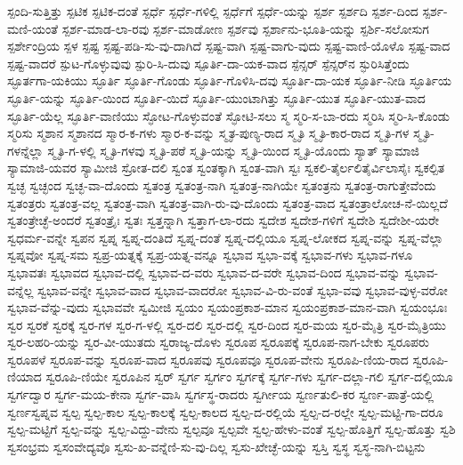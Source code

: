 ಸ್ಪಂದಿ-ಸುತ್ತಿತ್ತು
ಸ್ಪಟಿಕ
ಸ್ಪಟಿಕ-ದಂತೆ
ಸ್ಪರ್ಧೆ
ಸ್ಪರ್ಧೆ-ಗಳಿಲ್ಲಿ
ಸ್ಪರ್ಧೆಗೆ
ಸ್ಪರ್ಧೆ-ಯನ್ನು
ಸ್ಪರ್ಶ
ಸ್ಪರ್ಶದಿ
ಸ್ಪರ್ಶ-ದಿಂದ
ಸ್ಪರ್ಶ-ಮಣಿ-ಯಂತೆ
ಸ್ಪರ್ಶ-ಮಾಡ-ಲಾ-ರವು
ಸ್ಪರ್ಶ-ಮಾಡೋಣ
ಸ್ಪರ್ಶವು
ಸ್ಪರ್ಶಾನು-ಭೂತಿ-ಯನ್ನು
ಸ್ಪರ್ಶಿ-ಸಲೋಸುಗ
ಸ್ಪರ್ಶೇಂದ್ರಿಯ
ಸ್ಪಳ
ಸ್ಪಷ್ಟ
ಸ್ಪಷ್ಟ-ಪಡಿ-ಸು-ವು-ದಾಗಿದೆ
ಸ್ಪಷ್ಟ-ವಾಗಿ
ಸ್ಪಷ್ಟ-ವಾಗು-ವುದು
ಸ್ಪಷ್ಟ-ವಾಣಿ-ಯೊಳೊ
ಸ್ಪಷ್ಟ-ವಾದ
ಸ್ಪಷ್ಟ-ವಾದರೆ
ಸ್ಪುಟ-ಗೊಳ್ಳುವುವು
ಸ್ಪುರಿ-ಸಿ-ದುವು
ಸ್ಪೂರ್ತಿ-ದಾ-ಯಕ-ವಾದ
ಸ್ಪೆನ್ಸರ್
ಸ್ಪೆನ್ಸರ್‌ನ
ಸ್ಫುರಿಸಿತ್ತೆಂದು
ಸ್ಫೂರ್ತಗಾ-ಯಕಿಯು
ಸ್ಫೂರ್ತಿ
ಸ್ಫೂರ್ತಿ-ಗೊಂಡು
ಸ್ಫೂರ್ತಿ-ಗೊಳಿಸಿ-ದವು
ಸ್ಫೂರ್ತಿ-ದಾ-ಯಕ
ಸ್ಫೂರ್ತಿ-ನೀಡಿ
ಸ್ಫೂರ್ತಿಯ
ಸ್ಫೂರ್ತಿ-ಯನ್ನು
ಸ್ಫೂರ್ತಿ-ಯಿಂದ
ಸ್ಫೂರ್ತಿ-ಯಿದೆ
ಸ್ಫೂರ್ತಿ-ಯುಂಟಾಗಿತ್ತು
ಸ್ಫೂರ್ತಿ-ಯುತ
ಸ್ಫೂರ್ತಿ-ಯುತ-ವಾದ
ಸ್ಫೂರ್ತಿ-ಯೆಲ್ಲ
ಸ್ಫೂರ್ತಿ-ವಾಣಿಯು
ಸ್ಫೋಟ-ಗೊಳ್ಳುವಂತೆ
ಸ್ಫೋಟಿ-ಸಲು
ಸ್ಮ
ಸ್ಮರಿ-ಸ-ಬಾ-ರದು
ಸ್ಮರಿಸಿ
ಸ್ಮರಿ-ಸಿ-ಕೊಂಡು
ಸ್ಮರಿಸು
ಸ್ಮಶಾನ
ಸ್ಮಶಾನದ
ಸ್ಮಾರ-ಕ-ಗಳು
ಸ್ಮಾರ-ಕ-ವನ್ನು
ಸ್ಮೃತ-ಪುಣ್ಯ-ರಾದ
ಸ್ಮೃತಿ
ಸ್ಮೃತಿ-ಕಾರ-ರಾದ
ಸ್ಮೃತಿ-ಗಳ
ಸ್ಮೃತಿ-ಗಳನ್ನೆಲ್ಲಾ
ಸ್ಮೃತಿ-ಗ-ಳಲ್ಲಿ
ಸ್ಮೃತಿ-ಗಳವು
ಸ್ಮೃತಿ-ಪಠೆ
ಸ್ಮೃತಿ-ಯನ್ನು
ಸ್ಮೃತಿ-ಯಿಂದ
ಸ್ಮೃತಿ-ಯೊಂದು
ಸ್ಯಾತ್
ಸ್ಯಾಮಾಜಿ
ಸ್ಯಾಮಾಜಿ-ಯವರ
ಸ್ಯಾಮೀಜಿ
ಸ್ರೋತ-ದಲಿ
ಸ್ವಂತ
ಸ್ವಂತಕ್ಕಾಗಿ
ಸ್ವಂತ-ವಾಗಿ
ಸ್ವಃ
ಸ್ವಕಲಿ-ತೈರ್ಲಲಿತೈರ್ವಿಲಾಸೈಃ
ಸ್ವಕಲ್ಪಿತ
ಸ್ವಚ್ಛ
ಸ್ವಚ್ಛಂದ
ಸ್ವಚ್ಛ-ವಾ-ದೊಂದು
ಸ್ವತಂತ್ರ
ಸ್ವತಂತ್ರ-ನಾಗಿ
ಸ್ವತಂತ್ರ-ನಾಗಿಯೇ
ಸ್ವತಂತ್ರನು
ಸ್ವತಂತ್ರ-ರಾಗುತ್ತೇವೆಂದು
ಸ್ವತಂತ್ರರು
ಸ್ವತಂತ್ರ-ವಲ್ಲ
ಸ್ವತಂತ್ರ-ವಾಗಿ
ಸ್ವತಂತ್ರ-ವಾಗಿ-ರು-ವು-ದೊಂದು
ಸ್ವತಂತ್ರ-ವಾದ
ಸ್ವತಂತ್ರಾಲೋಚ-ನೆ-ಯಿಲ್ಲದೆ
ಸ್ವತಂತ್ರೇಚ್ಛೆ-ಅಂದರೆ
ಸ್ವತಂತ್ರೈಃ
ಸ್ವತಃ
ಸ್ವತ್ತನ್ನಾಗಿ
ಸ್ವತ್ತಾಗ-ಲಾ-ರದು
ಸ್ವದೇಶ
ಸ್ವದೇಶ-ಗಳಿಗೆ
ಸ್ವದೇಶಿ
ಸ್ವದೇಶೀ-ಯರೇ
ಸ್ವಧರ್ಮ-ವನ್ನೇ
ಸ್ವಪನ
ಸ್ವಪ್ನ
ಸ್ವಪ್ನ-ದಂತಿದೆ
ಸ್ವಪ್ನ-ದಂತೆ
ಸ್ವಪ್ನ-ದಲ್ಲಿಯೂ
ಸ್ವಪ್ನ-ಲೋಕದ
ಸ್ವಪ್ನ-ವನ್ನು
ಸ್ವಪ್ನ-ವೆಲ್ಲಾ
ಸ್ವಪ್ನವೋ
ಸ್ವಪ್ನ-ಸಮ
ಸ್ವಪ್ರ-ಯತ್ನಕ್ಕೆ
ಸ್ವಪ್ರ-ಯತ್ನ-ವನ್ನೂ
ಸ್ವಭಾವ
ಸ್ವಭಾ-ವಕ್ಕೆ
ಸ್ವಭಾವ-ಗಳು
ಸ್ವಭಾವ-ಗಳೂ
ಸ್ವಭಾವತಃ
ಸ್ವಭಾವದ
ಸ್ವಭಾವ-ದಲ್ಲಿ
ಸ್ವಭಾವ-ದ-ವರು
ಸ್ವಭಾವ-ದ-ವರೇ
ಸ್ವಭಾವ-ದಿಂದ
ಸ್ವಭಾವ-ವನ್ನು
ಸ್ವಭಾವ-ವನ್ನೆಲ್ಲ
ಸ್ವಭಾವ-ವನ್ನೇ
ಸ್ವಭಾವ-ವಾದ
ಸ್ವಭಾವ-ವಾದರೋ
ಸ್ವಭಾವ-ವಿ-ರು-ವಂತೆ
ಸ್ವಭಾ-ವವು
ಸ್ವಭಾವ-ವುಳ್ಳ-ವರೋ
ಸ್ವಭಾವ-ವೆನ್ನು-ವುದು
ಸ್ವಭಾವವೇ
ಸ್ವಮೀಜಿ
ಸ್ವಯಂ
ಸ್ವಯಂಪ್ರಕಾಶ-ಮಾನ
ಸ್ವಯಂಪ್ರಕಾಶ-ಮಾನ-ವಾಗಿ
ಸ್ವಯಂಭೂಃ
ಸ್ವರ
ಸ್ವರಕೆ
ಸ್ವರಕ್ಕೆ
ಸ್ವರ-ಗಳ
ಸ್ವರ-ಗ-ಳಲ್ಲಿ
ಸ್ವರ-ದಲಿ
ಸ್ವರ-ದಲ್ಲಿ
ಸ್ವರ-ದಿಂದ
ಸ್ವರ-ಮಯ
ಸ್ವರ-ಮೈತ್ರಿ
ಸ್ವರ-ಮೈತ್ರಿಯು
ಸ್ವರ-ಲಹರಿ-ಯನ್ನು
ಸ್ವರ-ವೀ-ಯುತದು
ಸ್ವರಾಜ್ಯ-ದೊಳು
ಸ್ವರೂಪ
ಸ್ವರೂಪಕ್ಕೆ
ಸ್ವರೂಪ-ನಾಗ-ಬೇಕು
ಸ್ವರೂಪರು
ಸ್ವರೂಪಳೆ
ಸ್ವರೂಪ-ವನ್ನು
ಸ್ವರೂಪ-ವಾದ
ಸ್ವರೂಪವು
ಸ್ವರೂಪವೂ
ಸ್ವರೂಪ-ವೇನು
ಸ್ವರೂಪಿ-ಣಿಯ-ರಾದ
ಸ್ವರೂಪಿ-ಣಿಯಾದ
ಸ್ವರೂಪಿ-ಣಿಯೇ
ಸ್ವರೂಪಿನ
ಸ್ವರ್
ಸ್ವರ್ಗ
ಸ್ವರ್ಗಂ
ಸ್ವರ್ಗಕ್ಕೆ
ಸ್ವರ್ಗ-ಗಳು
ಸ್ವರ್ಗ-ದಲ್ಲಾ-ಗಲಿ
ಸ್ವರ್ಗ-ದಲ್ಲಿಯೂ
ಸ್ವರ್ಗದ್ವಾರ
ಸ್ವರ್ಗ-ಮಯ-ಕೇನಾ
ಸ್ವರ್ಗ-ವಾಸಿ
ಸ್ವರ್ಗಸ್ಥ-ರಾದರು
ಸ್ವರ್ಗೀಯ
ಸ್ವರ್ಣತುಲಿ-ಕರ
ಸ್ವರ್ಣ-ಪಾತ್ರೆ-ಯಲ್ಲಿ
ಸ್ವರ್ಣಸ್ವಪ್ನವ
ಸ್ವಲ್ಪ
ಸ್ವಲ್ಪ-ಕಾಲ
ಸ್ವಲ್ಪ-ಕಾಲಕ್ಕೆ
ಸ್ವಲ್ಪ-ಕಾಲದ
ಸ್ವಲ್ಪ-ದ-ರಲ್ಲಿಯೆ
ಸ್ವಲ್ಪ-ದ-ರಲ್ಲೇ
ಸ್ವಲ್ಪ-ಮಟ್ಟಿ-ಗಾ-ದರೂ
ಸ್ವಲ್ಪ-ಮಟ್ಟಿಗೆ
ಸ್ವಲ್ಪ-ವನ್ನು
ಸ್ವಲ್ಪ-ವಿದ್ದು-ವೇನು
ಸ್ವಲ್ಪವೂ
ಸ್ವಲ್ಪವೇ
ಸ್ವಲ್ಪ-ಹೇಳು-ವಂತೆ
ಸ್ವಲ್ಪ-ಹೊತ್ತಿಗೆ
ಸ್ವಲ್ಪ-ಹೊತ್ತು
ಸ್ವಶಿ
ಸ್ವಸಂಭ್ರಮ
ಸ್ವಸಂವೇದ್ಯವೊ
ಸ್ವಸು-ಖ-ವನ್ನೆಣಿ-ಸು-ವು-ದಿಲ್ಲ
ಸ್ವಸು-ಖೇಚ್ಛೆ-ಯನ್ನು
ಸ್ವಸ್ತಿ
ಸ್ವಸ್ಥ
ಸ್ವಸ್ಥ-ನಾಗಿ-ಬಿಟ್ಟನು
